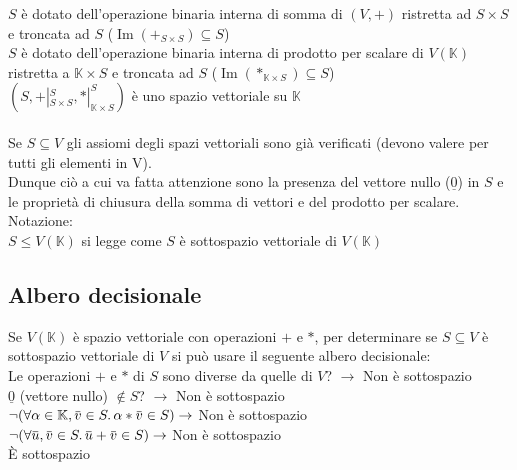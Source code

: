 \documentclass[a4paper, twoside, italian, 11pt]{book}
\newcommand{\overbar}[1] {\mkern 1.5mu\overline{\mkern-1.5mu#1\mkern-1.5mu}\mkern 1.5mu}
\DeclareMathOperator{\Ima}{Im}
\newcommand{\K}{\mathbb K}
\begin{document}
\noindent
$S$ è dotato dell'operazione binaria interna di somma di $(V, +)$ ristretta ad $S \times S$ e troncata ad $S$ ($\Ima(+_{S \times S}) \subseteq S$) \\

\noindent
$S$ è dotato dell'operazione binaria interna di prodotto per scalare di $V(\K)$ ristretta a $\K \times S$ e troncata ad $S$ ($\Ima(*_{\K \times S}) \subseteq S$) \\

\noindent
$(S, +|_{S \times S}^S, *|_{\K \times S}^S)$ è uno spazio vettoriale su $\K$ \\\\

\noindent
Se $S \subseteq V$ gli assiomi degli spazi vettoriali sono già verificati (devono valere per tutti gli elementi in V). \\
Dunque ciò a cui va fatta attenzione sono la presenza del vettore nullo ($\underline 0$) in $S$ e le proprietà di chiusura della somma di vettori e del prodotto per scalare. \\

\noindent
Notazione: \\
$S \leq V(\K)$ si legge come $S$ è sottospazio vettoriale di $V(\K)$


\subsection{Albero decisionale}

Se $V(\K)$ è spazio vettoriale con operazioni $+$ e $*$, per determinare se $S \subseteq V$ è sottospazio vettoriale di $V$ si può usare il seguente albero decisionale: \\

\noindent
Le operazioni $+$ e $*$ di $S$ sono diverse da quelle di $V$? $\rightarrow$ Non è sottospazio \\

\noindent
$\underline{0}$ (vettore nullo) $\not\in S$? $\rightarrow$ Non è sottospazio \\

\noindent
$\lnot(\forall \alpha \in \K, \overbar v \in S \ldotp \alpha * \overbar v \in S) \rightarrow$ Non è sottospazio \\

\noindent
$\lnot(\forall \overbar u, \overbar v \in S \ldotp \overbar u + \overbar v \in S) \rightarrow$ Non è sottospazio \\

\noindent
È sottospazio
\end{document}
